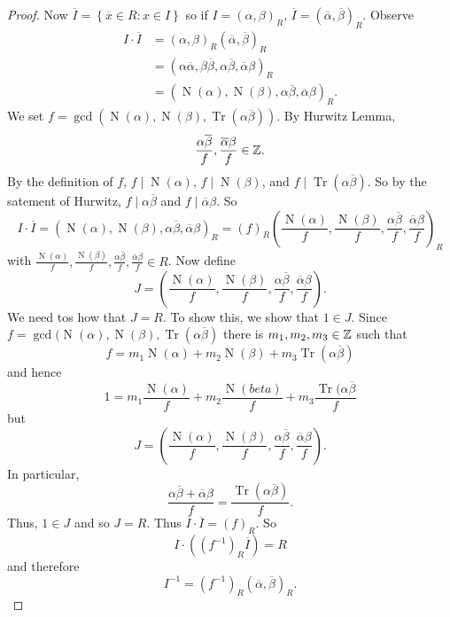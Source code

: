 \begin{proof}
	Now
	$
		\overline I = \left\{
			\overline x \in R: x \in I
		\right\}
	$
	so if $I = (\alpha, \beta)_R$,
	$\overline I = (\overline\alpha, \overline\beta)_R$.
	Observe
	\begin{align*}
		I \cdot \overline I
		&= (\alpha, \beta)_R (\overline\alpha, \overline\beta)_R \\
		&= (\alpha\overline\alpha, \beta\overline\beta, \alpha\overline\beta,
			\overline\alpha\beta)_R \\
		&= (\operatorname{N}(\alpha), \operatorname{N}(\beta),
			\alpha\overline\beta, \overline\alpha\beta)_R.
	\end{align*}
	We set 
	$f = \gcd(\operatorname{N}(\alpha),
	\operatorname{N}(\beta),
	\operatorname{Tr}(\alpha\overline\beta))$.
	By Hurwitz Lemma,
	\[
		\frac{\alpha\overline\beta}f, \frac{\overline\alpha\beta}f \in \mathbb{Z}.
	\]
	By the definition of $f$, $f \mid \operatorname{N}(\alpha)$,
	$f \mid \operatorname{N}(\beta)$, 
	and $f \mid \operatorname{Tr}(\alpha\overline\beta)$.
	So by the satement of Hurwitz, $f \mid \alpha\overline\beta$ and
	$f \mid \overline\alpha\beta$.
	So
	\[
		I \cdot \overline I
		= (\operatorname{N}(\alpha), \operatorname{N}(\beta),
			\alpha\overline\beta, \overline\alpha \beta)_R
		= (f)_R \left( \frac{\operatorname{N}(\alpha)}f,
			\frac{\operatorname{N}(\beta)}{f},
			\frac{\alpha\overline\beta}{f},
			\frac{\overline\alpha\beta}{f} 
		\right)_R
	\]
	with 
	$
		\frac{\operatorname{N}(\alpha)}{f},
		\frac{\operatorname{N}(\beta)}{f},
		\frac{\alpha\overline\beta}{f},
		\frac{\overline\alpha\beta}{f}
		\in R
	$.
	Now define
	\[
		J = \left( 
			\frac{\operatorname{N}(\alpha)}{f},
			\frac{\operatorname{N}(\beta)}{f},
			\frac{\alpha\overline\beta}{f},
			\frac{\overline\alpha\beta}{f}
		\right).
	\]
	We need tos how that $J = R$.
	To show this, we show that $1 \in J$.
	Since $f = \gcd(\operatorname{N}(\alpha), \operatorname{N}(\beta),
	\operatorname{Tr}(\alpha\overline\beta)$
	there is $m_1, m_2, m_3 \in \mathbb{Z}$ such that 
	\[
		f = m_1 \operatorname{N}(\alpha)
		+ m_2 \operatorname{N}(\beta)
		+ m_3 \operatorname{Tr}(\alpha\overline\beta)
	\]
	and hence
	\[
		1 
		= m_1 \frac{\operatorname{N}(\alpha)}{f} 
			+ m_2 \frac{\operatorname{N}(beta)}{f} 
			+ m_3 \frac{\operatorname{Tr}(\alpha\overline\beta}{f} 
	\]
	but
	\[
		J = \left( 
			\frac{\operatorname{N}(\alpha)}f,
			\frac{\operatorname{N}(\beta)}{f},
			\frac{\alpha\overline\beta}{f},
			\frac{\overline\alpha\beta}{f} 
		\right).
	\]
	In particular,
	\[
		\frac{\alpha\overline\beta + \overline\alpha\beta}{f} 
		= \frac{\operatorname{Tr}(\alpha\overline\beta)}{f}.
	\]
	Thus, $1 \in J$ and so $J = R$.
	Thus $I \cdot \overline I = (f)_R$.
	So
	\[
		I \cdot \left( \left( f^{-1} \right)_R \overline I \right) = R
	\]
	and therefore
	\[
		I^{-1} = \left( f^{-1} \right)_R (\overline\alpha,
		\overline\beta)_R.
	\]
\end{proof}

